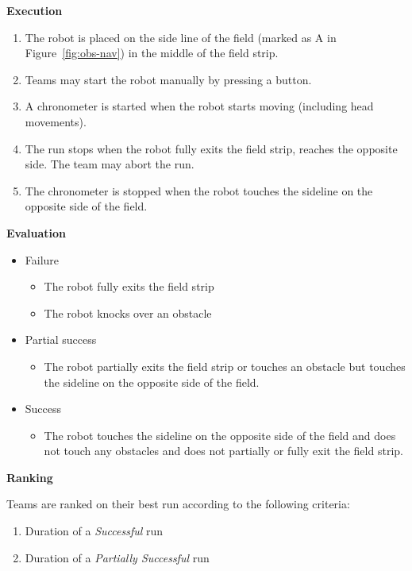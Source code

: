 {\vspace{2em}
{\bfseries Execution}
\begin{enumerate}
\item The robot is placed on the side line of the field (marked as A in Figure~\ref{fig:obs-nav}) in the middle of the field strip.
\item Teams may start the robot manually by pressing a button.
\item A chronometer is started when the robot starts moving (including head movements).
\item The run stops when the robot fully exits the field strip, reaches the opposite side. The team may abort the run.
\item The chronometer is stopped when the robot touches the sideline on the opposite side of the field.

\end{enumerate}
\vspace{2em}
{\bfseries Evaluation}
\begin{itemize}
\item Failure
\begin{itemize}
\item The robot fully exits the field strip
\item The robot knocks over an obstacle
\end{itemize}
\item Partial success
\begin{itemize}
\item The robot partially exits the field strip or touches an obstacle but touches the sideline on the opposite side of the field.
\end{itemize}
\item Success
\begin{itemize}
\item The robot touches the sideline on the opposite side of the field and does not touch any obstacles and does not partially or fully exit the field strip.
\end{itemize}
\end{itemize}



\vspace{2em}
{\bfseries Ranking}

Teams are ranked on their best run according to the following criteria:
\begin{enumerate}
\item Duration of a \textit{Successful} run
\item Duration of a \textit{Partially Successful} run
\end{enumerate}}
